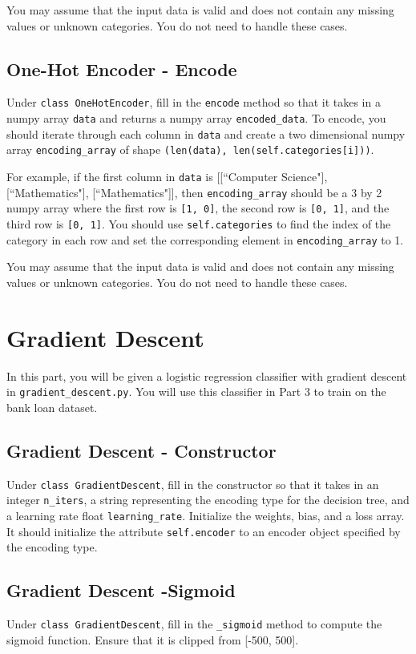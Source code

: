 \documentclass{article}
\begin{document}
You may assume that the input data is valid and does not contain any missing values or unknown categories. You do not need to handle these cases.

\subsection{One-Hot Encoder - Encode}
Under \verb|class OneHotEncoder|, fill in the \verb|encode| method so that it takes in a numpy array \verb|data| and returns a numpy array \verb|encoded_data|. To encode, you should iterate through each column in \verb|data| and create a two dimensional numpy array \verb|encoding_array| of shape \verb|(len(data), len(self.categories[i]))|.

For example, if the first column in \verb|data| is [[``Computer Science"], [``Mathematics"], [``Mathematics"]], then \verb|encoding_array| should be a 3 by 2 numpy array where the first row is \verb|[1, 0]|, the second row is \verb|[0, 1]|, and the third row is \verb|[0, 1]|. You should use \verb|self.categories| to find the index of the category in each row and set the corresponding element in \verb|encoding_array| to 1.

You may assume that the input data is valid and does not contain any missing values or unknown categories. You do not need to handle these cases.

\section{Gradient Descent}
In this part, you will be given a logistic regression classifier with gradient descent in \verb|gradient_descent.py|. You will use this classifier in Part 3 to train on the bank loan dataset. 

\subsection{Gradient Descent - Constructor}

Under \verb|class GradientDescent|, fill in the constructor so that it takes in an integer \verb|n_iters|, a string representing the encoding type for the decision tree, and a learning rate float \verb|learning_rate|. Initialize the weights, bias, and a loss array. It should initialize the attribute \verb|self.encoder| to an encoder object specified by the encoding type.

\subsection{Gradient Descent -Sigmoid}
Under \verb|class GradientDescent|, fill in the \verb|_sigmoid| method to compute the sigmoid function. Ensure that it is clipped from [-500, 500].
\end{document}
